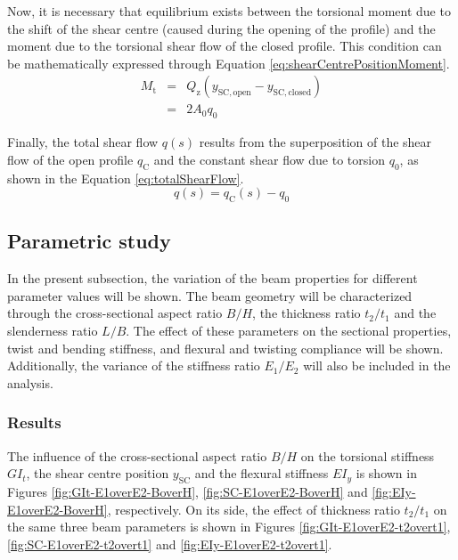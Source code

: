 Now, it is necessary that equilibrium exists between the torsional moment due to the shift of the shear centre (caused during the opening of the profile) and the moment due to the torsional shear flow of the closed profile. This condition can be mathematically expressed through Equation \ref{eq:shearCentrePositionMoment}. 
%
\begin{eqnarray}\label{eq:shearCentrePositionMoment}
  M_\mathrm{t} &=& Q_\mathrm{z} (y_{\mathrm{SC,open}} - y_{\mathrm{SC,closed}}) \nonumber \\
  &=& 2 A_0 q_0
\end{eqnarray}
%

Finally, the total shear flow $q(s)$ results from the superposition of the shear flow of the open profile $q_\mathrm{C}$ and the constant shear flow due to torsion $q_0$, as shown in the Equation \ref{eq:totalShearFlow}.
%
\begin{equation}\label{eq:totalShearFlow}
  q(s) = q_\mathrm{C}(s) - q_0 %
\end{equation}

\subsection{Parametric study} \label{subsec:parametricStudy} %

In the present subsection, the variation of the beam properties for different parameter values will be shown. The beam geometry will be characterized through the cross-sectional aspect ratio $B/H$, the thickness ratio $t_2/t_1$ and the slenderness ratio $L/B$. The effect of these parameters on the sectional properties, twist and bending stiffness, and flexural and twisting compliance will be shown. Additionally, the variance of the stiffness ratio $E_1/E_2$ will also be included in the analysis.

\subsubsection{Results} \label{subsubsec:results_parametricStudy}

The influence of the cross-sectional aspect ratio $B/H$ on the torsional stiffness $G I_t$, the shear centre position $y_{\mathrm{SC}}$ and the flexural stiffness $E I_y$ is shown in Figures \ref{fig:GIt-E1overE2-BoverH}, \ref{fig:SC-E1overE2-BoverH} and \ref{fig:EIy-E1overE2-BoverH}, respectively. On its side, the effect of thickness ratio $t_2/t_1$ on the same three beam parameters is shown in Figures \ref{fig:GIt-E1overE2-t2overt1}, \ref{fig:SC-E1overE2-t2overt1} and \ref{fig:EIy-E1overE2-t2overt1}.

